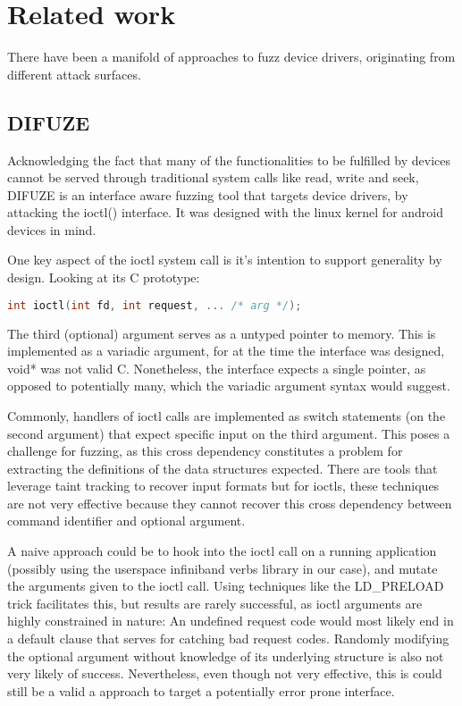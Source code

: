 \section{Related work}

There have been a manifold of approaches to fuzz device drivers, originating from different attack surfaces.

\subsection{DIFUZE}

Acknowledging the fact that many of the functionalities to be fulfilled by devices cannot be served through
traditional system calls like read, write and seek, DIFUZE is an interface aware fuzzing tool that targets
device drivers, by attacking the ioctl() interface\cite{difuze17}. It was designed with the linux kernel for
android devices in mind.


One key aspect of the ioctl system call is it's intention to support generality by design.
Looking at its C prototype:

\begin{lstlisting}[language=c]
  int ioctl(int fd, int request, ... /* arg */);
\end{lstlisting}

The third (optional) argument serves as a untyped pointer to memory. This is implemented as a variadic argument, for at the time
the interface was designed, void* was not valid C. Nonetheless, the interface expects a single pointer, as opposed to potentially
many, which the variadic argument syntax would suggest.

Commonly, handlers of ioctl calls are implemented as switch statements (on the second argument) that expect specific
input on the third argument. This poses a challenge for fuzzing, as this cross dependency constitutes a problem for extracting
the definitions of the data structures expected. There are tools that leverage taint tracking to recover input formats\cite{buzzfuzz}\cite{dowser}
but for ioctls, these techniques are not very effective\cite{difuze17} because they cannot recover this cross dependency between command identifier
and optional argument.

A naive approach could be to hook into the ioctl call on a running application (possibly using the userspace infiniband verbs library
in our case), and mutate the arguments given to the ioctl call. Using techniques like the LD\_PRELOAD trick facilitates this,
but results are rarely successful, as ioctl arguments are highly constrained in nature: An undefined request code
would most likely end in a default clause that serves for catching bad request codes. Randomly modifying the optional argument
without knowledge of its underlying structure is also not very likely of success.
Nevertheless, even though not very effective, this is could still be a valid a approach to target a potentially error prone interface.

